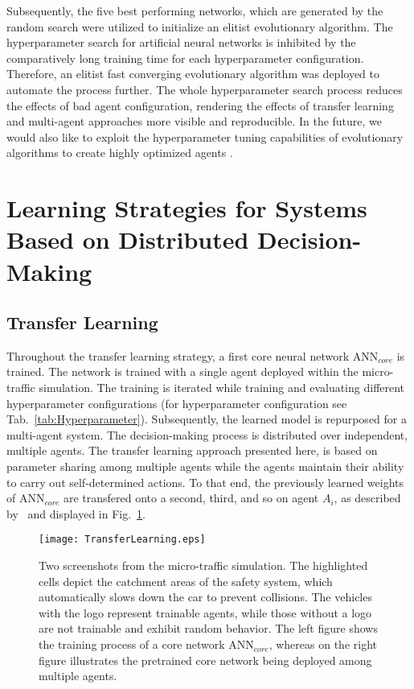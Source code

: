 \documentclass{article}
\begin{document}
Subsequently, the five best performing networks, which are generated by the random search were utilized to initialize an elitist evolutionary algorithm. The hyperparameter search for artificial neural networks is inhibited by the comparatively long training time for each hyperparameter configuration. Therefore, an elitist fast converging evolutionary algorithm was deployed to automate the process further. The whole hyperparameter search process reduces the effects of bad agent configuration, rendering the effects of transfer learning and multi-agent approaches more visible and reproducible. In the future, we would also like to exploit the hyperparameter tuning capabilities of evolutionary algorithms to create highly optimized agents \cite{Salimans.2017,Such.2017,Conti.2017}.















\section{Learning Strategies for Systems Based on Distributed Decision-Making}


\subsection{Transfer Learning}
Throughout the transfer learning strategy, a first core neural network ANN$_{core}$ is trained. The network is trained with a single agent deployed within the micro-traffic simulation. The training is iterated while training and evaluating different hyperparameter configurations (for hyperparameter configuration see Tab.~\ref{tab:Hyperparameter}).     
Subsequently, the learned model is repurposed for a multi-agent system.
The decision-making process is distributed over independent, multiple agents. The transfer learning approach presented here, is based on parameter sharing among multiple agents while the agents maintain their ability to carry out self-determined actions. To that end, the previously learned weights of ANN$_{core}$ are transfered onto a second, third, and so on agent $A_i$, as described by~\cite{TRANSFER.2009} and displayed in Fig.~\ref{fig:TransferLearning}. 
\begin{figure}[ht]
	\centering
	\texttt{[image: TransferLearning.eps]}
	\caption{Two screenshots from the micro-traffic simulation. The highlighted cells depict the catchment areas of the safety system, which automatically slows down the car to prevent collisions. The vehicles with the logo represent trainable agents, while those without a logo are not trainable and exhibit random behavior. The left figure shows the training process of a core network ANN$_{core}$, whereas on the right figure illustrates the pretrained core network being deployed among multiple agents.}
	\label{fig:TransferLearning}
\end{figure}
\end{document}
